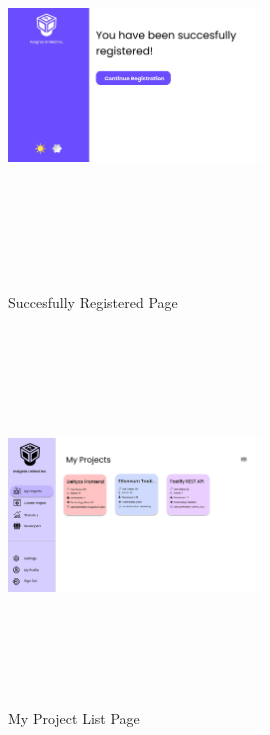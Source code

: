 \begin{figure}[H]
\includegraphics[height=10cm, width=0.6\textwidth]{./images/prototype/0008}
\centering 
\caption{Succesfully Registered Page}
\label{fig:prototype1}

\includegraphics[height=10cm, width=0.6\textwidth]{./images/prototype/0003}
\centering 
\caption{My Project List Page}
\label{fig:prototype1}
\end{figure}

